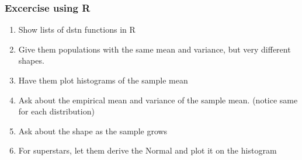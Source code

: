 \begin{frame}
    \frametitle{Excercise using R}
    \begin{enumerate}
        \item Show lists of dstn functions in R
        \item Give them populations with the same mean and variance, but very different shapes.
        \item Have them plot histograms of the sample mean
        \item Ask about the empirical mean and variance of the sample mean. (notice same for each distribution)
        \item Ask about the shape as the sample grows
        \item For superstars, let them derive the Normal and plot it on the histogram
    \end{enumerate}
\end{frame}
